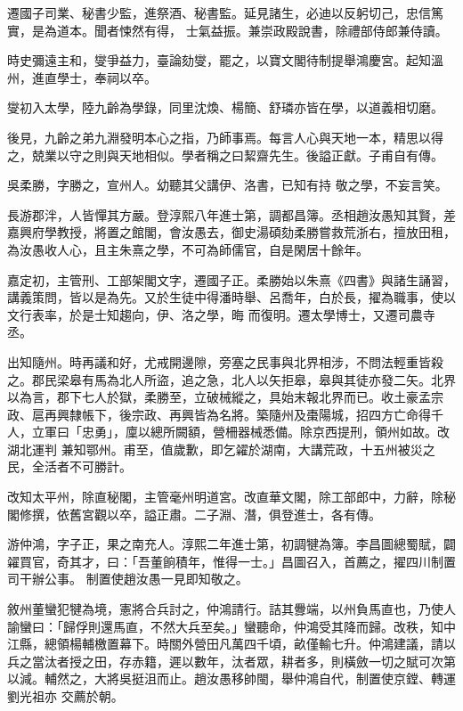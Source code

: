 \begin{pinyinscope}
 遷國子司業、秘書少監，進祭酒、秘書監。延見諸生，必迪以反躬切己，忠信篤實，是為道本。聞者悚然有得，
 士氣益振。兼崇政殿說書，除禮部侍郎兼侍讀。



 時史彌遠主和，燮爭益力，臺論劾燮，罷之，以寶文閣待制提舉鴻慶宮。起知溫州，進直學士，奉祠以卒。



 燮初入太學，陸九齡為學錄，同里沈煥、楊簡、舒璘亦皆在學，以道義相切磨。



 後見，九齡之弟九淵發明本心之指，乃師事焉。每言人心與天地一本，精思以得之，兢業以守之則與天地相似。學者稱之曰絜齋先生。後謚正獻。子甫自有傳。



 吳柔勝，字勝之，宣州人。幼聽其父講伊、洛書，已知有持
 敬之學，不妄言笑。



 長游郡泮，人皆憚其方嚴。登淳熙八年進士第，調都昌簿。丞相趙汝愚知其賢，差嘉興府學教授，將置之館閣，會汝愚去，御史湯碩劾柔勝嘗救荒浙右，擅放田租，為汝愚收人心，且主朱熹之學，不可為師儒官，自是閑居十餘年。



 嘉定初，主管刑、工部架閣文字，遷國子正。柔勝始以朱熹《四書》與諸生誦習，講義策問，皆以是為先。又於生徒中得潘時舉、呂喬年，白於長，擢為職事，使以文行表率，於是士知趨向，伊、洛之學，晦
 而復明。遷太學博士，又遷司農寺丞。



 出知隨州。時再議和好，尤戒開邊隙，旁塞之民事與北界相涉，不問法輕重皆殺之。郡民梁皋有馬為北人所盜，追之急，北人以矢拒皋，皋與其徒亦發二矢。北界以為言，郡下七人於獄，柔勝至，立破械縱之，具始末報北界而已。收土豪孟宗政、扈再興隸帳下，後宗政、再興皆為名將。築隨州及棗陽城，招四方亡命得千人，立軍曰「忠勇」，廩以總所闕額，營柵器械悉備。除京西提刑，領州如故。改湖北運判
 兼知鄂州。甫至，值歲歉，即乞糴於湖南，大講荒政，十五州被災之民，全活者不可勝計。



 改知太平州，除直秘閣，主管毫州明道宮。改直華文閣，除工部郎中，力辭，除秘閣修撰，依舊宮觀以卒，謚正肅。二子淵、潛，俱登進士，各有傳。



 游仲鴻，字子正，果之南充人。淳熙二年進士第，初調犍為簿。李昌圖總蜀賦，闢糴買官，奇其才，曰：「吾董餉積年，惟得一士。」昌圖召入，首薦之，擢四川制置司干辦公事。
 制置使趙汝愚一見即知敬之。



 敘州董蠻犯犍為境，憲將合兵討之，仲鴻請行。詰其釁端，以州負馬直也，乃使人諭蠻曰：「歸俘則還馬直，不然大兵至矣。」蠻聽命，仲鴻受其降而歸。改秩，知中江縣，總領楊輔檄置幕下。時關外營田凡萬四千頃，畝僅輸七升。仲鴻建議，請以兵之當汰者授之田，存赤籍，遲以數年，汰者眾，耕者多，則橫斂一切之賦可次第以減。輔然之，大將吳挺沮而止。趙汝愚移帥閩，舉仲鴻自代，制置使京鏜、轉運劉光祖亦
 交薦於朝。




\end{pinyinscope}
